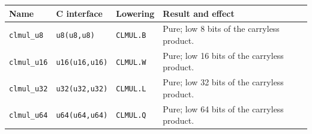 \begingroup\footnotesize
\setlength{\tabcolsep}{2pt}
\begin{longtable}{@{}p{1.3in}p{1.55in}p{0.75in}p{2.0in}@{}}
\toprule
\textbf{Name} & \textbf{C interface} & \textbf{Lowering} & \textbf{Result and effect}\\
\midrule
\endhead
\texttt{clmul\_u8} & \texttt{u8(u8,u8)} & \texttt{CLMUL.B} & Pure; low 8 bits of the carryless product.\\
\texttt{clmul\_u16} & \texttt{u16(u16,u16)} & \texttt{CLMUL.W} & Pure; low 16 bits of the carryless product.\\
\texttt{clmul\_u32} & \texttt{u32(u32,u32)} & \texttt{CLMUL.L} & Pure; low 32 bits of the carryless product.\\
\texttt{clmul\_u64} & \texttt{u64(u64,u64)} & \texttt{CLMUL.Q} & Pure; low 64 bits of the carryless product.\\
\bottomrule
\end{longtable}
\endgroup
